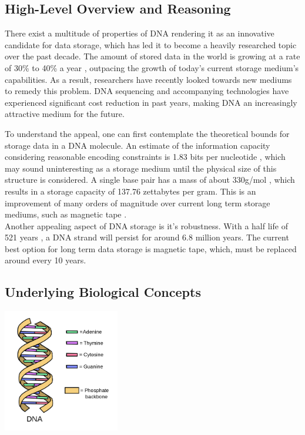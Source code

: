 \documentclass[a4paper,conference]{IEEEtran}
\begin{document}
\subsection{High-Level Overview and Reasoning}
There exist a multitude of properties of DNA rendering it as an innovative candidate for data storage, which has led it to become a heavily researched topic over the past decade. The amount of stored data in the world is growing at a rate of 30\% to 40\% a year \cite{globaldatagrowth}, outpacing the growth of today's current storage medium's capabilities. As a result, researchers have recently looked towards new mediums to remedy this problem. DNA sequencing and accompanying technologies have experienced significant cost reduction in past years, making DNA an increasingly attractive medium for the future. 

To understand the appeal, one can first contemplate the theoretical bounds for storage data in a DNA molecule.  An estimate of the information capacity considering reasonable encoding constraints is 1.83 bits per nucleotide \cite{1}, which may sound uninteresting as a storage medium until the physical size of this structure is considered.  A single base pair has a mass of about 330g/mol \cite{2}, which results in a storage capacity of 137.76 zettabytes per gram. This is an improvement of many orders of magnitude over current long term storage mediums, such as magnetic tape \cite{?}.\\

Another appealing aspect of DNA storage is it's robustness. With a half life of 521 years \cite{dnahalflife}, a DNA strand will persist for around 6.8 million years. The current best option for long term data storage is magnetic tape, which, must be replaced around every 10 years.


 

\subsection{Underlying Biological Concepts}

\begin{center}
\includegraphics[width=2in]{dna}
\end{center}
\end{document}
